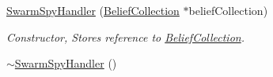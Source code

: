 \begin{DoxyCompactItemize}
\item 
\hyperlink{class_swarm_spy_handler_a395b2484a128445cd8b2ce02182c8b79}{SwarmSpyHandler} (\hyperlink{class_belief_collection}{BeliefCollection} $\ast$beliefCollection)
\begin{DoxyCompactList}\small\item\em Constructor, Stores reference to \hyperlink{class_belief_collection}{BeliefCollection}. \end{DoxyCompactList}\item 
\hypertarget{class_swarm_spy_handler_ad0afea71fb86aea82aa3d39fc8e8281f}{
\hyperlink{class_swarm_spy_handler_ad0afea71fb86aea82aa3d39fc8e8281f}{$\sim$SwarmSpyHandler} ()}
\label{class_swarm_spy_handler_ad0afea71fb86aea82aa3d39fc8e8281f}


\end{DoxyCompactItemize}
